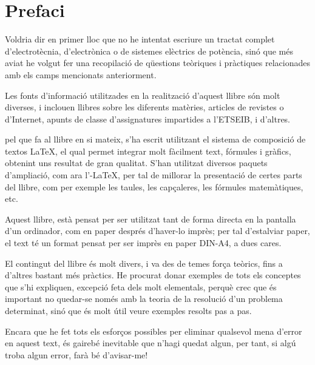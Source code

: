 \chapter*{Prefaci} 

   Voldria dir en primer lloc que no he intentat escriure un tractat complet
   d'electrot\`{e}cnia, d'electr\`{o}nica o de sistemes el\`{e}ctrics de pot\`{e}ncia, sin\'{o} que m\'{e}s aviat
   he volgut
   fer una recopilaci\'{o} de q\"{u}estions te\`{o}riques i pr\`{a}ctiques relacionades amb els camps mencionats
   anteriorment.

   Les fonts d'informaci\'{o} utilitzades en la realitzaci\'{o} d'aquest llibre s\'{o}n molt diverses,
   i inclouen llibres sobre les diferents mat\`{e}ries, articles de revistes o d'Internet,
   apunts de classe d'assignatures impartides a l'\textsf{ETSEIB}, i d'altres.

   pel que fa al llibre en si mateix, s'ha escrit utilitzant el sistema de composici\'{o} de
   textos \LaTeX, el qual
   permet integrar molt f\`{a}cilment text, f\'{o}rmules i gr\`{a}fics, obtenint uns resultat de
   gran qualitat. S'han utilitzat diversos paquets d'ampliaci\'{o}, com ara
   l'\AmS-\LaTeX,
   per tal de millorar la presentaci\'{o} de certes parts del
   llibre, com per exemple les taules, les cap\c{c}aleres, les f\'{o}rmules matem\`{a}tiques, etc.

   Aquest llibre, est\`{a} pensat per ser utilitzat tant de forma directa en la pantalla d'un
   ordinador, com en paper despr\'{e}s d'haver-lo impr\`{e}s; per tal d'estalviar paper, el text
   t\'{e} un format pensat per ser impr\`{e}s en paper DIN-A4, a dues cares.

    El contingut del llibre \'{e}s molt divers, i va des de temes for\c{c}a te\`{o}rics, fins a
    d'altres bastant m\'{e}s pr\`{a}ctics. He procurat donar exemples de tots els conceptes
    que s'hi expliquen, excepci\'{o} feta dels molt elementals, perqu\`{e} crec que \'{e}s important
     no quedar-se nom\'{e}s amb la teoria de  la resoluci\'{o} d'un problema determinat, sin\'{o} que
     \'{e}s molt \'{u}til veure exemples resolts pas a pas.

    Encara que he fet tots els esfor\c{c}os possibles per eliminar qualsevol
    mena  d'error en aquest text, \'{e}s gaireb\'{e} inevitable que n'hagi quedat algun,
    per tant, si alg\'{u} troba algun error, far\`{a} b\'{e} d'avisar-me!


